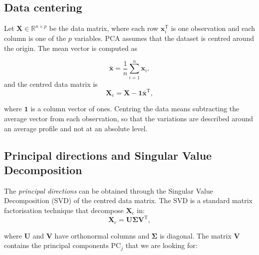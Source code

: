 \subsection{Data centering}
\label{subsec:pca_centering_covariance}

Let \(\mathbf{X} \in \mathbb{R}^{n \times p}\) be the data matrix, where each row \(\mathbf{x}_i^{\mathrm{T}}\) is one observation and each column is one of the \(p\) variables. PCA assumes that the dataset is centred around the origin. The mean vector is computed as

\begin{equation}
    \bar{\mathbf{x}} =
    \frac{1}{n}\sum_{i=1}^{n}\mathbf{x}_i,
    \label{eq:pca_mean_spectrum}
\end{equation}
 and the centred data matrix is
\begin{equation}
    \mathbf{X}_c =
    \mathbf{X} - \mathbf{1}\bar{\mathbf{x}}^{\mathrm{T}},
    \label{eq:pca_centered_matrix}
\end{equation}

where \(\mathbf{1}\) is a column vector of ones. Centring the data means subtracting the average vector from each observation, so that the variations are described around an average profile and not at an absolute level.

\subsection{Principal directions and Singular Value Decomposition}
\label{subsec:pca_svd}

The \textit{principal directions} can be obtained through the Singular Value Decomposition (SVD) \cite{brunton2019datadriven} of the centred data matrix. The SVD is a standard matrix factorisation technique that decompose \(\mathbf{X}_c\) in:
\begin{equation}
    \mathbf{X}_c =
    \mathbf{U}\boldsymbol{\Sigma}\mathbf{V}^{\mathrm{T}},
    \label{eq:pca_svd}
\end{equation}

where \(\mathbf{U}\) and \(\mathbf{V}\) have orthonormal columns and \(\boldsymbol{\Sigma}\) is diagonal. The matrix \(\mathbf{V}\) contains the principal components \(\mathrm{PC}_j\) that we are looking for:

